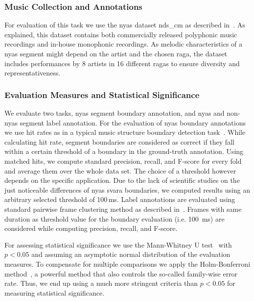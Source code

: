 {\subsubsection{Music Collection and Annotations}

For evaluation of this task we use the \gls{nyas} dataset \acrshort{nds_cm} as described in~. As explained, this dataset contains both commercially released polyphonic music recordings and in-house monophonic recordings. As melodic characteristics of a \gls{nyas} segment might depend on the artist and the chosen \gls{raga}, the dataset includes performances by 8 artists in 16 different \glspl{raga} to ensure diversity and representativeness.

\subsubsection{Evaluation Measures and Statistical Significance}

We evaluate two tasks, \gls{nyas} segment boundary annotation, and \gls{nyas} and non-\gls{nyas} segment label annotation. For the evaluation of \gls{nyas} boundary annotations we use hit rates as in a typical music structure boundary detection task~\citep{Ong05ICMC}. While calculating hit rate, segment boundaries are considered as correct if they fall within a certain threshold of a boundary in the ground-truth annotation. Using matched hits, we compute standard precision, recall, and F-score for every fold and average them over the whole data set. The choice of a threshold however depends on the specific application. Due to the lack of scientific studies on the just noticeable differences of \gls{nyas} \gls{svara} boundaries, we computed results using an arbitrary selected threshold of 100\,ms. Label annotations are evaluated using standard pairwise frame clustering method as described in~\cite{levy2008structural}. Frames with same duration as threshold value for the boundary evaluation (i.e. 100~ms) are considered while computing precision, recall, and F-score. 

For assessing statistical significance we use the Mann-Whitney U test~\citep{mann1947test} with $p<0.05$ and assuming an asymptotic normal distribution of the evaluation measures. To compensate for multiple comparisons we apply the Holm-Bonferroni method~\citep{holm1979simple}, a powerful method that also controls the so-called family-wise error rate. Thus, we end up using a much more stringent criteria than $p<0.05$ for measuring statistical significance.

}
